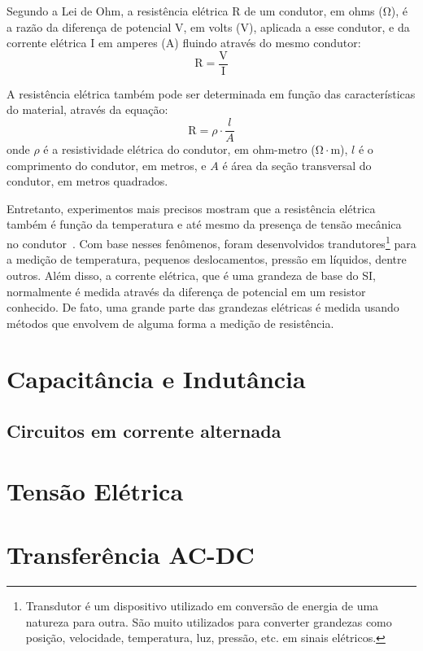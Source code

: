 \documentclass{book}
\begin{document}
Segundo a Lei de Ohm, a resistência elétrica $\mathrm{R}$ de um condutor, em ohms ($\mathrm{\Omega}$), é a razão da diferença de potencial $\mathrm{V}$, em volts (V), aplicada a esse condutor, e da corrente elétrica $\mathrm{I}$ em amperes (A) fluindo através do mesmo condutor:
\begin{equation}
\mathrm{R} = \dfrac{\mathrm{V}}{\mathrm{I}}
\end{equation}

A resistência elétrica também pode ser determinada em função das características do material, através da equação:
\begin{equation}
  \mathrm{R} = \rho \cdot \dfrac{l}{A}
\end{equation}
onde $\rho$ é a resistividade elétrica do condutor, em ohm-metro ($\mathrm{\Omega} \cdot \mathrm{m}$), $l$ é o comprimento do condutor, em metros, e $A$ é área da seção transversal do condutor, em metros quadrados.

Entretanto, experimentos mais precisos mostram que a resistência elétrica também é função da temperatura e até mesmo da presença de tensão mecânica no condutor~\cite{fluke}. Com base nesses fenômenos, foram desenvolvidos trandutores\footnote{Transdutor é um dispositivo utilizado em conversão de energia de uma natureza para outra. São muito utilizados para converter grandezas como posição, velocidade, temperatura, luz, pressão, etc. em sinais elétricos.} para a medição de temperatura, pequenos deslocamentos, pressão em líquidos, dentre outros. Além disso, a corrente elétrica, que é uma grandeza de base do SI, normalmente é medida através da diferença de potencial em um resistor conhecido. De fato, uma grande parte das grandezas elétricas é medida usando métodos que envolvem de alguma forma a medição de resistência.

\section{Capacitância e Indutância}

\subsection{Circuitos em corrente alternada}

\section{Tensão Elétrica}
\section{Transferência AC-DC}
\end{document}
